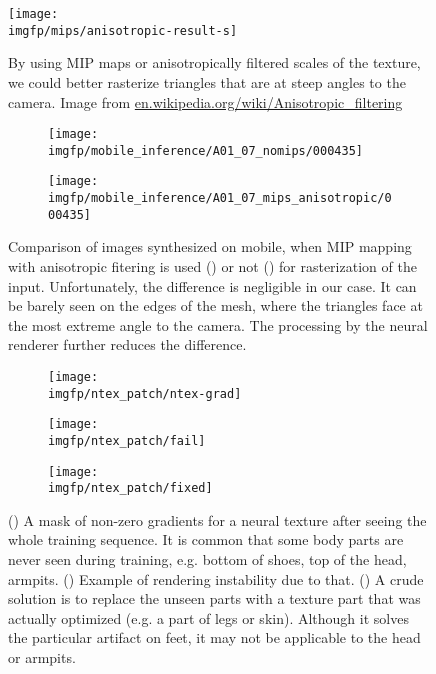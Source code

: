 \begin{figure}
	\centering
	\texttt{[image: \\imgfp/mips/anisotropic-result-s]}
	\caption{By using MIP maps or anisotropically filtered scales of the texture, we could better rasterize triangles that are at steep angles to the camera. Image from \href{https://en.wikipedia.org/wiki/Anisotropic_filtering}{en.wikipedia.org/wiki/Anisotropic\_filtering}}
	\label{fig:anisotropic_result}
\end{figure}
\begin{figure}
	\centering
	\begin{subfigure}[b]{0.49\textwidth}
		\centering
		\texttt{[image: \\imgfp/mobile\_inference/A01\_07\_nomips/000435]}%
		\caption{}
		\label{fig:no_mipmap_inference}
	\end{subfigure}
	\hfill
	\begin{subfigure}[b]{0.49\textwidth}
		\centering
		\texttt{[image: \\imgfp/mobile\_inference/A01\_07\_mips\_anisotropic/000435]}
		\caption{}
		\label{fig:anisotropic_inference}
	\end{subfigure}
	\caption{Comparison of images synthesized on mobile, when MIP mapping with anisotropic fitering is used (\protect{}) or not (\protect{}) for rasterization of the input. Unfortunately, the difference is negligible in our case. It can be barely seen on the edges of the mesh, where the triangles face at the most extreme angle to the camera. The processing by the neural renderer further reduces the difference.}
\end{figure}
\begin{figure}
	\centering
	\begin{subfigure}[b]{0.35\textwidth}
		\centering
		\texttt{[image: \\imgfp/ntex\_patch/ntex-grad]}%
		\caption{}
		\label{fig:ntex-grad}
	\end{subfigure}
	\hfill
	\begin{subfigure}[b]{0.3\textwidth}
		\centering
		\texttt{[image: \\imgfp/ntex\_patch/fail]}
		\caption{}
		\label{fig:ntex-artifact}
	\end{subfigure}
	\hfill
	\begin{subfigure}[b]{0.3\textwidth}
		\centering
		\texttt{[image: \\imgfp/ntex\_patch/fixed]}
		\caption{}
		\label{fig:ntex-fixed}
	\end{subfigure}
	\caption{(\protect{}) A mask of non-zero gradients for a neural texture after seeing the whole training sequence. It is common that some body parts are never seen during training, e.g. bottom of shoes, top of the head, armpits. (\protect{}) Example of rendering instability due to that. (\protect{}) A crude solution is to replace the unseen parts with a texture part that was actually optimized (e.g. a part of legs or skin). Although it solves the particular artifact on feet, it may not be applicable to the head or armpits.}
\end{figure}
